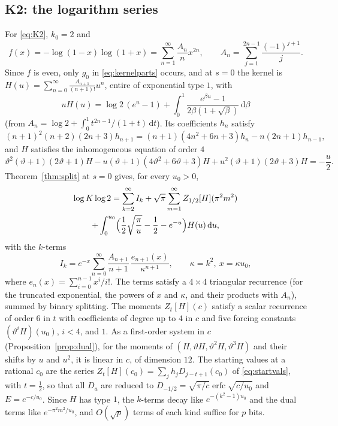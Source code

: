 \documentclass[11pt,reqno]{amsart}
\theoremstyle{definition}
\theoremstyle{remark}
\newcommand{\erfc}{\operatorname{erfc}}
\newcommand{\dd}{\,\mathrm{d}}
\begin{document}
\subsection{K2: the logarithm series}\label{sec:logform}
For \eqref{eq:K2}, $k_0 = 2$ and
\[
  f(x) = -\log(1-x)\log(1+x) = \sum_{n=1}^{\infty}\frac{A_n}{n}x^{2n}, \qquad A_n = \sum_{j=1}^{2n-1}\frac{(-1)^{j+1}}j.
\]
Since $f$ is even, only $g_0$ in \eqref{eq:kernelparts} occurs, and at $s = 0$ the kernel is
$H(u) = \sum_{n=0}^{\infty}\frac{A_{n+1}}{(n+1)!}u^n$, entire of exponential type $1$, with
\[
  uH(u) = \log 2\,(e^u-1) + \int_0^1\frac{e^{\beta u}-1}{2\beta(1+\sqrt\beta)}\dd\beta
\]
(from $A_n = \log 2 + \int_0^1 t^{2n-1}/(1+t)\dd t$). Its coefficients $h_n$ satisfy
\[
  (n+1)^2(n+2)(2n+3)h_{n+1} = (n+1)(4n^2+6n+3)h_n - n(2n+1)h_{n-1},
\]
and $H$ satisfies the inhomogeneous equation of order $4$
\[
  \vartheta^2(\vartheta+1)(2\vartheta+1)H - u(\vartheta+1)(4\vartheta^2+6\vartheta+3)H
  + u^2(\vartheta+1)(2\vartheta+3)H = -\frac u2.
\]
Theorem~\ref{thm:split} at $s = 0$ gives, for every $u_0 > 0$,
\begin{multline*}
  \log K\log 2 = \sum_{k=2}^{\infty}I_k + \sqrt\pi\sum_{m=1}^{\infty}Z_{1/2}[H](\pi^2m^2) \\
  + \int_0^{u_0}\Bigl(\frac12\sqrt{\frac\pi u} - \frac12 - e^{-u}\Bigr)H(u)\dd u,
\end{multline*}
with the $k$-terms
\[
  I_k = e^{-x}\sum_{n=0}^{\infty}\frac{A_{n+1}}{n+1}\,\frac{e_{n+1}(x)}{\kappa^{n+1}}, \qquad \kappa = k^2,\ x = \kappa u_0,
\]
where $e_n(x) = \sum_{i=0}^{n-1}x^i/i!$. The terms satisfy a $4\times4$ triangular recurrence (for the truncated
exponential, the powers of $x$ and $\kappa$, and their products with $A_n$), summed by binary splitting. The moments
$Z_t[H](c)$ satisfy a scalar recurrence of order $6$ in $t$ with coefficients of degree up to $4$ in $c$ and five
forcing constants $(\vartheta^iH)(u_0)$, $i < 4$, and $1$. As a first-order system in $c$
(Proposition~\ref{prop:dual}), for the moments of $(H, \vartheta H, \vartheta^2H, \vartheta^3H)$ and their shifts by
$u$ and $u^2$, it is linear in $c$, of dimension $12$. The starting values at a rational $c_0$ are the series
$Z_t[H](c_0) = \sum_jh_jD_{j-t+1}(c_0)$ of \eqref{eq:startvals}, with $t = \frac12$, so that all $D_a$ are reduced to
$D_{-1/2} = \sqrt{\pi/c}\erfc\sqrt{c/u_0}$ and $E = e^{-c/u_0}$. Since $H$ has type $1$, the $k$-terms decay like
$e^{-(k^2-1)u_0}$ and the dual terms like $e^{-\pi^2m^2/u_0}$, and $O(\sqrt p)$ terms of each kind suffice for $p$ bits.
\end{document}
